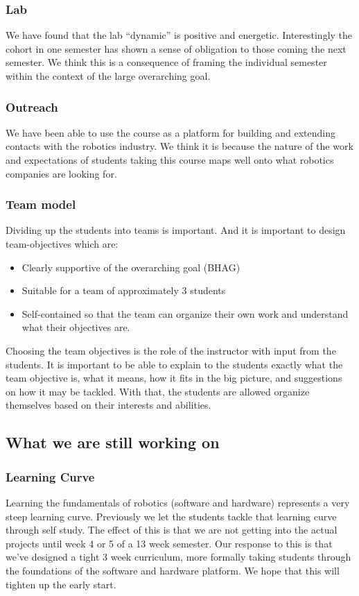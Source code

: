 \subsubsection{Lab} We have found that the lab “dynamic” is positive and energetic. Interestingly the cohort in one semester has shown a sense of obligation to those coming the next semester. We think this is a consequence of framing the individual semester within the context of the large overarching goal.
\subsubsection{Outreach} We have been able to use the course as a platform for building and extending contacts with the robotics industry. We think it is because the nature of the work and expectations of students taking this course maps well onto what robotics companies are looking for.
\subsubsection{Team model}Dividing up the students into teams is important. And it is important to design team-objectives which are:
\begin{itemize}
\item Clearly supportive of the overarching goal (BHAG)
\item Suitable for a team of approximately 3 students
\item Self-contained so that the team can organize their own work and understand what their objectives are.
\end{itemize}
Choosing the team objectives is the role of the instructor with input from the students. It is important to be able to explain to the students exactly what the team objective is, what it means, how it fits in the big picture, and suggestions on how it may be tackled. With that, the students are allowed organize themselves based on their interests and abilities.

\subsection{What we are still working on}
\subsubsection{Learning Curve}Learning the fundamentals of robotics (software and hardware) represents a very steep learning curve. Previously we let the students tackle that learning curve through self study. The effect of this is that we are not getting into the actual projects until week 4 or 5 of a 13 week semester. Our response to this is that we've designed a tight 3 week curriculum, more formally taking students through the foundations of the software and hardware platform. We hope that this will tighten up the early start.
